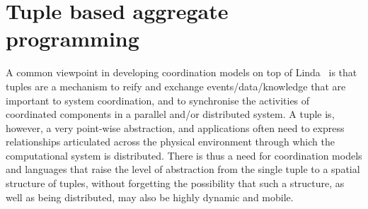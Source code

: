 \documentclass[12pt,a4paper,twoside,openright]{book}
\begin{document}
% 
% 


\chapter{Tuple based aggregate programming}

A common viewpoint in developing coordination models on top of Linda~\cite{linda-toplas7} is that tuples are a mechanism to reify and exchange events/data/knowledge that are important to system coordination, and to synchronise the activities of coordinated components in a parallel and/or distributed system.
%
A tuple is, however, a very point-wise abstraction, and applications often need to express relationships articulated across the physical environment through which the computational system is distributed.
%
There is thus a need for coordination models and languages that raise the level of abstraction from the single tuple to a spatial structure of tuples, without forgetting the possibility that such a structure, as well as being distributed, may also be highly dynamic and mobile.
\end{document}
